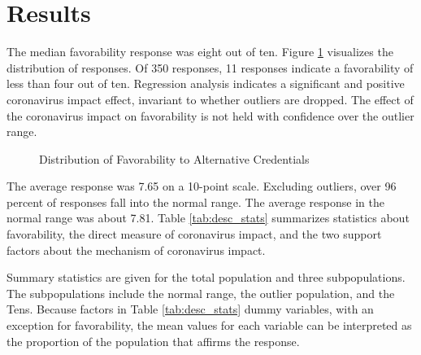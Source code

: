 \documentclass[review]{elsarticle}
\begin{document}
\section{Results}

The median favorability response was eight out of ten.
Figure \ref{fig:one} visualizes the distribution of responses.
Of 350 responses, 11 responses indicate a favorability of less than four out of ten.
Regression analysis indicates a significant and positive coronavirus impact effect,
invariant to whether outliers are dropped.
The effect of the coronavirus impact on favorability
is not held with confidence over the outlier range.

\begin{figure}[h!]
    \centering
    \caption{Distribution of Favorability to Alternative Credentials}
    \label{fig:one}
\end{figure}

The average response was 7.65 on a 10-point scale.
Excluding outliers, over 96 percent of responses fall into the normal range.
The average response in the normal range was about 7.81.
Table \ref{tab:desc_stats} summarizes statistics about favorability,
the direct measure of coronavirus impact,
and the two support factors about the mechanism of coronavirus impact.

Summary statistics are given for the total population and three subpopulations.
The subpopulations include the normal range, the outlier population, and the Tens.
Because factors in Table \ref{tab:desc_stats} dummy variables,
with an exception for favorability,
the mean values for each variable can be interpreted as the proportion of the population
that affirms the response.
\end{document}
